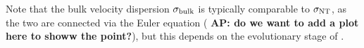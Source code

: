 \IfFileExists{emulateapjlegacy.cls}{\documentclass[iop]{emulateapjlegacy}}{\documentclass[iop]{emulateapj}}
\newcommand{\AP}[1]{({\bf \color{apcolor} AP: #1})}
\begin{document}
%
Note that the bulk velocity dispersion $\sigma_{\rm bulk}$ is typically comparable to $\sigma_{\rm NT}$, as the two are connected via the Euler equation \AP{do we want to add a plot here to showw the point?}, but this depends on the evolutionary stage of \flower.
%

\end{document}
